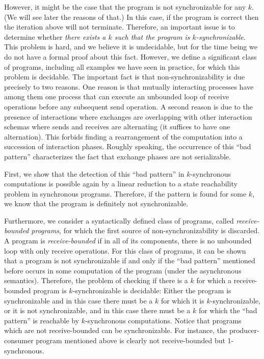 However, it might be the case that the program is not synchronizable for any $k$. (We will see later the reasons of that.) In this case, if the program is correct then the iteration above will not terminate. Therefore, an important issue is to determine whether {\em there exists a $k$ such that the program is $k$-synchronizable}. This problem is hard, and we believe it is undecidable, but for the time being we do not have a formal proof about this fact. However, we define a significant class of programs, including all examples we have seen in practice, for which this problem is decidable.  The important fact is that non-synchronizability is due precisely to two reasons. One reason is that mutually interacting processes have among them one process that can execute an unbounded loop of receive operations before any subsequent send operation. 
A second reason is due to the presence of interactions where exchanges are overlapping with other interaction schemas where sends and receives are alternating (it suffices to have one alternation). This forbids finding a rearrangement of the computation into a succession of interaction phases. Roughly speaking, the occurrence of this “bad pattern” characterizes the fact that exchange phases are not serializable. 

First, we show that the detection of this “bad pattern” in $k$-synchronous computations is possible again by a linear reduction to a state reachability problem in synchronous programs. Therefore, if the pattern is found for some $k$, we know that the program is definitely not synchronizable. 

Furthermore, we consider a syntactically defined class of programs, called {\em receive-bounded programs}, for which the first source of non-synchronizability is  discarded. A program is {\em receive-bounded} if in all of its components, there is no unbounded loop with only receive operations. For this class of programs, it can be shown that a program is not synchronizable if and only if the “bad pattern” mentioned before occurs in some computation of the program (under the asynchronous semantics). Therefore, the problem of checking if there is a $k$ for which a receive-bounded program is $k$-synchronizable is decidable: Either the program is synchronizable and in this case there must be a $k$ for which it is $k$-synchronizable, or it is not synchronizable, and in this case there must be a $k$ for which the “bad pattern” is reachable by $k$-synchronous computations. Notice that programs which are not receive-bounded can be synchronizable. For instance, the producer-consumer program mentioned above is clearly not receive-bounded but 1-synchronous. 

